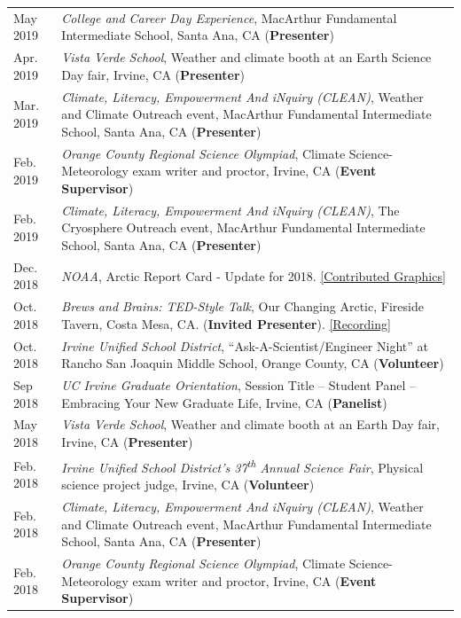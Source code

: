 \documentclass[margin,line,palatino,courier,10pt]{res}
\begin{document}
\begin{resume}
\begin{tabular}{@{}p{0.9in}p{4in}}
May 2019 & \textit{College and Career Day Experience}, MacArthur Fundamental Intermediate School, Santa Ana, CA (\textbf{Presenter})\\
Apr. 2019 & \textit{Vista Verde School}, Weather and climate booth at an Earth Science Day fair, Irvine, CA (\textbf{Presenter})\\
Mar. 2019 & \textit{Climate, Literacy, Empowerment And iNquiry (CLEAN)}, Weather and Climate Outreach event, MacArthur Fundamental Intermediate School, Santa Ana, CA (\textbf{Presenter})\\
Feb. 2019 & \textit{Orange County Regional Science Olympiad}, Climate Science-Meteorology exam writer and proctor, Irvine, CA (\textbf{Event Supervisor})\\
Feb. 2019 & \textit{Climate, Literacy, Empowerment And iNquiry (CLEAN)}, The Cryosphere Outreach event, MacArthur Fundamental Intermediate School, Santa Ana, CA (\textbf{Presenter})\\
Dec. 2018 & \textit{NOAA}, Arctic Report Card - Update for 2018. \href{https://www.youtube.com/watch?v=XntO9a-NpeM}{[Contributed Graphics]}\\
Oct. 2018 & \textit{Brews and Brains: TED-Style Talk}, Our Changing Arctic, Fireside Tavern, Costa Mesa, CA. (\textbf{Invited Presenter}). \href{https://www.youtube.com/watch?v=A5qQpDtOdvg}{[Recording]}\\
Oct. 2018 & \textit{Irvine Unified School District}, ``Ask-A-Scientist/Engineer Night'' at Rancho San Joaquin Middle School, Orange County, CA (\textbf{Volunteer})\\
Sep 2018 & \textit{UC Irvine Graduate Orientation}, Session Title -- Student Panel -- Embracing Your New Graduate Life, Irvine, CA (\textbf{Panelist})\\
May 2018 & \textit{Vista Verde School}, Weather and climate booth at an Earth Day fair, Irvine, CA (\textbf{Presenter})\\
Feb. 2018 & \textit{Irvine Unified School District's 37\textsuperscript{th} Annual Science Fair}, Physical science project judge, Irvine, CA (\textbf{Volunteer})\\
Feb. 2018 & \textit{Climate, Literacy, Empowerment And iNquiry (CLEAN)}, Weather and Climate Outreach event, MacArthur Fundamental Intermediate School, Santa Ana, CA (\textbf{Presenter})\\
Feb. 2018 & \textit{Orange County Regional Science Olympiad}, Climate Science-Meteorology exam writer and proctor, Irvine, CA (\textbf{Event Supervisor})\\

\end{tabular}
\end{resume}
\end{document}
